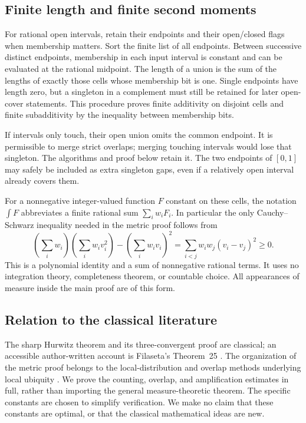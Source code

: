 \subsection{Finite length and finite second moments}

For rational open intervals, retain their endpoints and their open/closed
flags when membership matters.  Sort the finite list of all endpoints.
Between successive distinct endpoints, membership in each input interval
is constant and can be evaluated at the rational midpoint.  The length
of a union is the sum of the lengths of exactly those cells whose
membership bit is one.  Single endpoints have length zero, but a singleton
in a complement must still be retained for later open-cover statements.
This procedure proves finite additivity on disjoint cells and finite
subadditivity by the inequality between membership bits.

If intervals only touch, their open union omits the common endpoint.
It is permissible to merge strict overlaps; merging touching intervals
would lose that singleton.  The algorithms and proof below retain it.
The two endpoints of $[0,1]$ may safely be included as extra singleton
gaps, even if a relatively open interval already covers them.

For a nonnegative integer-valued function $F$ constant on these cells,
the notation $\int F$ abbreviates a finite rational sum
$\sum_i w_iF_i$.  In particular the only Cauchy--Schwarz inequality needed
in the metric proof follows from
\[
 \left(\sum_i w_i\right)\left(\sum_i w_i v_i^2\right)
   -\left(\sum_i w_i v_i\right)^2
 =\sum_{i<j}w_iw_j(v_i-v_j)^2\ge0.
\]
This is a polynomial identity and a sum of nonnegative rational terms.
It uses no integration theory, completeness theorem, or countable choice.
All appearances of measure inside the main proof are of this form.

\subsection{Relation to the classical literature}

The sharp Hurwitz theorem and its three-convergent proof are classical;
an accessible author-written account is Filaseta's Theorem~25
\cite{filaseta}.  The organization of the metric proof belongs to the
local-distribution and overlap methods underlying local ubiquity
\cite{bv,bdv}.  We prove the counting, overlap, and amplification estimates
in full, rather than importing the general measure-theoretic theorem.
The specific constants are chosen to simplify verification.  We make no
claim that these constants are optimal, or that the classical mathematical
ideas are new.
